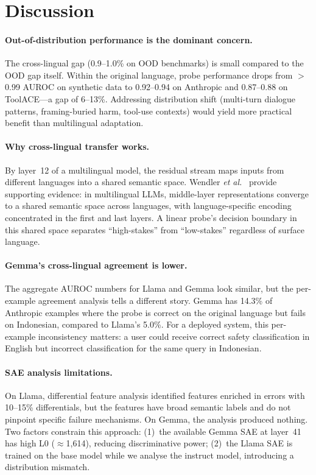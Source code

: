 \documentclass{article}
\newcommand{\etal}{\textit{et al.}\xspace}
\newcommand{\auroc}{AUROC\xspace}
\begin{document}
\section{Discussion}
\label{sec:discussion}

\paragraph{Out-of-distribution performance is the dominant concern.}
The cross-lingual gap (0.9--1.0\% on OOD benchmarks) is small compared to the
OOD gap itself.
Within the original language, probe performance drops from ${>}$0.99 \auroc on
synthetic data to 0.92--0.94 on Anthropic and 0.87--0.88 on ToolACE---a gap of
6--13\%.
Addressing distribution shift (multi-turn dialogue patterns, framing-buried
harm, tool-use contexts) would yield more practical benefit than multilingual
adaptation.

\paragraph{Why cross-lingual transfer works.}
By layer~12 of a multilingual model, the residual stream maps inputs from
different languages into a shared semantic space.
Wendler \etal~\cite{wendler2024} provide supporting evidence: in multilingual
LLMs, middle-layer representations converge to a shared semantic space across
languages, with language-specific encoding concentrated in the first and last
layers.
A linear probe's decision boundary in this shared space separates
``high-stakes'' from ``low-stakes'' regardless of surface language.

\paragraph{Gemma's cross-lingual agreement is lower.}
The aggregate \auroc numbers for Llama and Gemma look similar, but the
per-example agreement analysis tells a different story.
Gemma has 14.3\% of Anthropic examples where the probe is correct on the
original language but fails on Indonesian, compared to Llama's 5.0\%.
For a deployed system, this per-example inconsistency matters: a user could
receive correct safety classification in English but incorrect classification
for the same query in Indonesian.

\paragraph{SAE analysis limitations.}
On Llama, differential feature analysis identified features enriched in errors
with 10--15\% differentials, but the features have broad semantic labels and do
not pinpoint specific failure mechanisms.
On Gemma, the analysis produced nothing.
Two factors constrain this approach: (1)~the available Gemma SAE at layer~41
has high L0 ($\approx$1,614), reducing discriminative power;
(2)~the Llama SAE is trained on the base model while we analyse the instruct
model, introducing a distribution mismatch.
\end{document}
